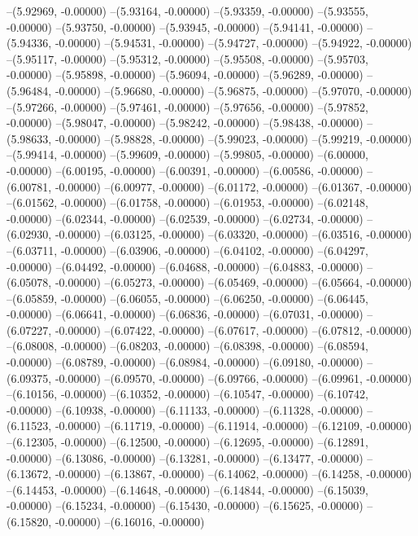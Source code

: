 --(5.92969, -0.00000)
--(5.93164, -0.00000)
--(5.93359, -0.00000)
--(5.93555, -0.00000)
--(5.93750, -0.00000)
--(5.93945, -0.00000)
--(5.94141, -0.00000)
--(5.94336, -0.00000)
--(5.94531, -0.00000)
--(5.94727, -0.00000)
--(5.94922, -0.00000)
--(5.95117, -0.00000)
--(5.95312, -0.00000)
--(5.95508, -0.00000)
--(5.95703, -0.00000)
--(5.95898, -0.00000)
--(5.96094, -0.00000)
--(5.96289, -0.00000)
--(5.96484, -0.00000)
--(5.96680, -0.00000)
--(5.96875, -0.00000)
--(5.97070, -0.00000)
--(5.97266, -0.00000)
--(5.97461, -0.00000)
--(5.97656, -0.00000)
--(5.97852, -0.00000)
--(5.98047, -0.00000)
--(5.98242, -0.00000)
--(5.98438, -0.00000)
--(5.98633, -0.00000)
--(5.98828, -0.00000)
--(5.99023, -0.00000)
--(5.99219, -0.00000)
--(5.99414, -0.00000)
--(5.99609, -0.00000)
--(5.99805, -0.00000)
--(6.00000, -0.00000)
--(6.00195, -0.00000)
--(6.00391, -0.00000)
--(6.00586, -0.00000)
--(6.00781, -0.00000)
--(6.00977, -0.00000)
--(6.01172, -0.00000)
--(6.01367, -0.00000)
--(6.01562, -0.00000)
--(6.01758, -0.00000)
--(6.01953, -0.00000)
--(6.02148, -0.00000)
--(6.02344, -0.00000)
--(6.02539, -0.00000)
--(6.02734, -0.00000)
--(6.02930, -0.00000)
--(6.03125, -0.00000)
--(6.03320, -0.00000)
--(6.03516, -0.00000)
--(6.03711, -0.00000)
--(6.03906, -0.00000)
--(6.04102, -0.00000)
--(6.04297, -0.00000)
--(6.04492, -0.00000)
--(6.04688, -0.00000)
--(6.04883, -0.00000)
--(6.05078, -0.00000)
--(6.05273, -0.00000)
--(6.05469, -0.00000)
--(6.05664, -0.00000)
--(6.05859, -0.00000)
--(6.06055, -0.00000)
--(6.06250, -0.00000)
--(6.06445, -0.00000)
--(6.06641, -0.00000)
--(6.06836, -0.00000)
--(6.07031, -0.00000)
--(6.07227, -0.00000)
--(6.07422, -0.00000)
--(6.07617, -0.00000)
--(6.07812, -0.00000)
--(6.08008, -0.00000)
--(6.08203, -0.00000)
--(6.08398, -0.00000)
--(6.08594, -0.00000)
--(6.08789, -0.00000)
--(6.08984, -0.00000)
--(6.09180, -0.00000)
--(6.09375, -0.00000)
--(6.09570, -0.00000)
--(6.09766, -0.00000)
--(6.09961, -0.00000)
--(6.10156, -0.00000)
--(6.10352, -0.00000)
--(6.10547, -0.00000)
--(6.10742, -0.00000)
--(6.10938, -0.00000)
--(6.11133, -0.00000)
--(6.11328, -0.00000)
--(6.11523, -0.00000)
--(6.11719, -0.00000)
--(6.11914, -0.00000)
--(6.12109, -0.00000)
--(6.12305, -0.00000)
--(6.12500, -0.00000)
--(6.12695, -0.00000)
--(6.12891, -0.00000)
--(6.13086, -0.00000)
--(6.13281, -0.00000)
--(6.13477, -0.00000)
--(6.13672, -0.00000)
--(6.13867, -0.00000)
--(6.14062, -0.00000)
--(6.14258, -0.00000)
--(6.14453, -0.00000)
--(6.14648, -0.00000)
--(6.14844, -0.00000)
--(6.15039, -0.00000)
--(6.15234, -0.00000)
--(6.15430, -0.00000)
--(6.15625, -0.00000)
--(6.15820, -0.00000)
--(6.16016, -0.00000)
